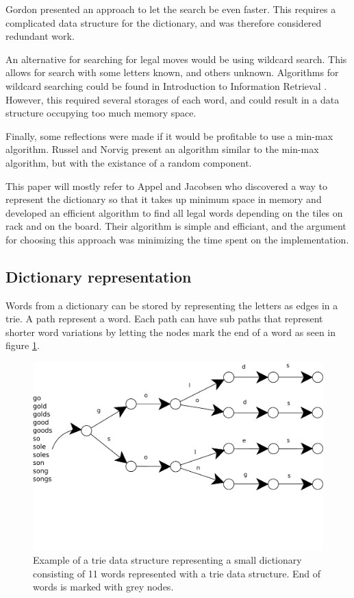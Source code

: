 \documentclass[a4paper, 12pt]{report}
\begin{document}
Gordon\cite{faster} presented an approach to let the search be even faster. This requires a complicated data structure for the dictionary, and was therefore considered redundant work. 

An alternative for searching for legal moves would be using wildcard search. This allows for search with some letters known, and others unknown. Algorithms for wildcard searching could be found in Introduction to Information Retrieval \cite{inforetrieve}. However, this required several storages of each word, and could result in a data structure occupying too much memory space.

Finally, some reflections were made if it would be profitable to use a min-max algorithm. Russel and Norvig\cite{ai} present an algorithm similar to the min-max algorithm, but with the existance of a random component. 

This paper will mostly refer to Appel and Jacobsen \cite{fastest} who discovered a way to represent the dictionary so that it takes up minimum space in memory and developed an efficient algorithm to find all legal words depending on the tiles on rack and on the board. Their algorithm is simple and efficiant, and the argument for choosing this approach was minimizing the time spent on the implementation.

\subsection{Dictionary representation}
\label{dic-rep}
Words from a dictionary can be stored by representing the letters as edges in a trie. A path represent a word. Each path can have sub paths that represent shorter word variations by letting the nodes mark the end of a word as seen in figure \ref{fig:trie}. 

\begin{figure}[h]
\centering
\includegraphics[scale=1]{trie}
\caption{Example of a trie data structure representing a small dictionary consisting of 11 words represented with a trie data structure. End of words is marked with grey nodes.}
\label{fig:trie}
\end{figure}
\end{document}
